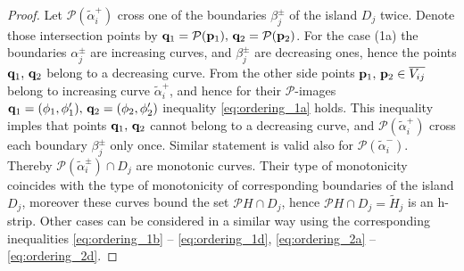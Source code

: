 \begin{proof}
	Let $\mathcal{P} (\widetilde{\alpha}_i^+)$ cross one of the boundaries $\beta_j^{\pm}$ of the island $D_j$ twice.
	Denote those intersection points by $\vb{q}_1 = \mathcal{P}(\vb{p}_1), \, \vb{q}_2 = \mathcal{P}(\vb{p}_2)$.
	For the case (1a) the boundaries $\alpha_j^{\pm}$ are increasing curves, and $\beta_j^{\pm}$ are decreasing ones, hence the points $\vb{q}_1, \, \vb{q}_2$ belong to a decreasing curve.
	From the other side points $\vb{p}_1, \, \vb{p}_2 \in \overline{V_{ij}}$ belong to increasing curve $\widetilde{\alpha}_i^+$, and hence for their $\mathcal{P}$-images $\vb{q}_1 = (\phi_1, \phi_1'), \, \vb{q}_2 = (\phi_2, \phi_2')$ inequality \eqref{eq:ordering_1a} holds.
	This inequality imples that points $\vb{q}_1, \, \vb{q}_2$ cannot belong to a decreasing curve, and $\mathcal{P} (\widetilde{\alpha}_i^+)$ cross each boundary $\beta_j^{\pm}$ only once.
	Similar statement is valid also for $\mathcal{P} (\widetilde{\alpha}_i^-)$.
	Thereby $\mathcal{P} (\widetilde{\alpha}_i^{\pm}) \cap D_j$ are monotonic curves.
	Their type of monotonicity coincides with the type of monotonicity of corresponding boundaries of the island $D_j$, moreover these curves bound the set $\mathcal{P} H \cap D_j$, hence $\mathcal{P} H \cap D_j = \widetilde{H}_j$ is an h-strip.
	Other cases can be considered in a similar way using the corresponding inequalities \eqref{eq:ordering_1b} -- \eqref{eq:ordering_1d}, \eqref{eq:ordering_2a} -- \eqref{eq:ordering_2d}.
	

\end{proof}
